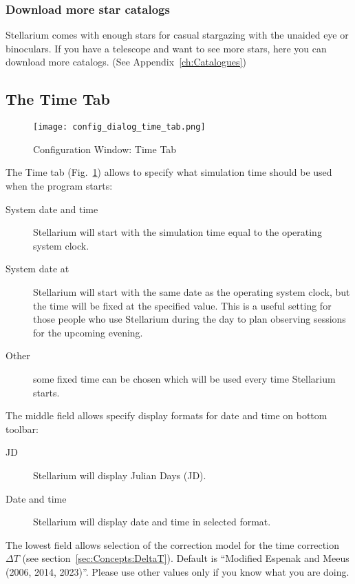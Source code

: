 \subsubsection{Download more star catalogs}
Stellarium comes with enough stars for casual stargazing with the
unaided eye or binoculars. If you have a telescope and want to see
more stars, here you can download more catalogs. (See Appendix~\ref{ch:Catalogues})

\subsection{The Time Tab}
\label{sec:gui:configuration:time}

\begin{figure}[htbp]
\centering\texttt{[image: config\_dialog\_time\_tab.png]}
\caption{Configuration Window: Time Tab}
\label{fig:gui:configuration:time}
\end{figure}

The Time tab (Fig.~\ref{fig:gui:configuration:time}) allows to specify what simulation time should be used
when the program starts:

\begin{description}
\item[System date and time] Stellarium will start with
  the simulation time equal to the operating system clock.
\item[System date at] Stellarium will start with the
  same date as the operating system clock, but the time will be fixed at
  the specified value. This is a useful setting for those people who use
  Stellarium during the day to plan observing sessions for the upcoming
  evening.
\item[Other] some fixed time can be chosen which will
  be used every time Stellarium starts.
\end{description}

\noindent The middle field allows specify display formats for date and time on bottom toolbar:
\begin{description}
\item[JD] Stellarium will display Julian Days (JD).
\item[Date and time] Stellarium will display date and time in selected format.
\end{description}

\noindent The lowest field allows selection of the correction model for the time
correction $\Delta T$ (see section~\ref{sec:Concepts:DeltaT}). Default
is ``Modified Espenak and Meeus (2006, 2014, 2023)''. Please use other values only if you
know what you are doing.

